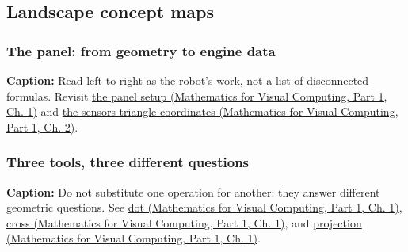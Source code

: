 \subsection{Landscape concept maps}\label{appendix-38d9c8aca357-landscape-concept-maps}

\hypertarget{appendix-38d9c8aca357-landscape-concept-maps}{}

\subsubsection{The panel: from geometry to engine data}\label{appendix-38d9c8aca357-the-panel-from-geometry-to-engine-data}

\hypertarget{appendix-38d9c8aca357-the-panel-from-geometry-to-engine-data}{}


\textbf{Caption:} Read left to right as the robot's work, not a list of disconnected formulas. Revisit \href{../02-Mathematics-for-Visual-Computing-P01/main.pdf\#01-foundations-i-ch017-the-panel-gives-us-a-reason-to-learn}{the panel setup (Mathematics for Visual Computing, Part 1, Ch. 1)} and \href{../02-Mathematics-for-Visual-Computing-P01/main.pdf\#01-foundations-i-ch018-the-sensor-needs-coordinates-inside-the-triangle}{the sensor\textquotesingle s triangle coordinates (Mathematics for Visual Computing, Part 1, Ch. 2)}.

\subsubsection{Three tools, three different questions}\label{appendix-38d9c8aca357-three-tools-three-different-questions}

\hypertarget{appendix-38d9c8aca357-three-tools-three-different-questions}{}


\textbf{Caption:} Do not substitute one operation for another: they answer different geometric questions. See \href{../02-Mathematics-for-Visual-Computing-P01/main.pdf\#01-foundations-i-ch017-the-dot-product-turns-two-movements-into-a-measurement}{dot (Mathematics for Visual Computing, Part 1, Ch. 1)}, \href{../02-Mathematics-for-Visual-Computing-P01/main.pdf\#01-foundations-i-ch017-oriented-area-tells-us-which-side-of-the-panel-is-front}{cross (Mathematics for Visual Computing, Part 1, Ch. 1)}, and \href{../02-Mathematics-for-Visual-Computing-P01/main.pdf\#01-foundations-i-ch017-projection-separates-useful-movement-from-sideways-movement}{projection (Mathematics for Visual Computing, Part 1, Ch. 1)}.

